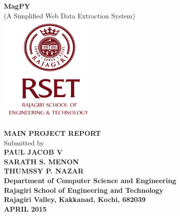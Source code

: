 \documentclass[a4paper]{report}
\begin{document}

\titlepage 
\begin{center}
\huge\textbf{MagPY}\\[.5cm]
\LARGE\textnormal{(A Simplified Web Data Extraction System)}\\[.5cm]
\vspace{0.5cm}
\includegraphics[width=5.0cm]{logo.png}\\[0.7cm]
\vspace{.5cm}

\LARGE\textbf{MAIN PROJECT REPORT}\\[0.7cm]
\LARGE\textnormal{Submitted by}\\[0.5cm]
\Large \textbf {PAUL JACOB V}\\[.5cm]
\Large \textbf {SARATH S. MENON}\\[.5cm]
\Large \textbf {THUMSSY P. NAZAR}\\[1.5cm]


\large\textbf{Department of Computer Science and Engineering}\\[0.5cm]
\textbf{Rajagiri School of Engineering and Technology}\\[0.5cm]
\textbf{Rajagiri Valley, Kakkanad, Kochi, 682039}\\[0.5cm]
\textbf{APRIL 2015}\\[0.5cm]
\end{center}
\end{document}

